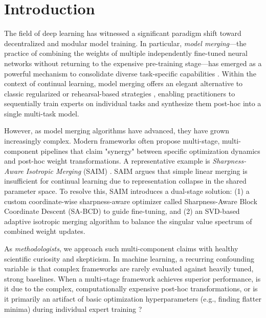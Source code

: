 \section{Introduction}
\label{sec:intro}

The field of deep learning has witnessed a significant paradigm shift toward decentralized and modular model training. In particular, \emph{model merging}—the practice of combining the weights of multiple independently fine-tuned neural networks without returning to the expensive pre-training stage—has emerged as a powerful mechanism to consolidate diverse task-specific capabilities \cite{modelsoups, taskarithmetic, tiesmerging}. Within the context of continual learning, model merging offers an elegant alternative to classic regularized or rehearsal-based strategies \cite{ewc, gem, der, lwf}, enabling practitioners to sequentially train experts on individual tasks and synthesize them post-hoc into a single multi-task model.

However, as model merging algorithms have advanced, they have grown increasingly complex. Modern frameworks often propose multi-stage, multi-component pipelines that claim "synergy" between specific optimization dynamics and post-hoc weight transformations. A representative example is \emph{Sharpness-Aware Isotropic Merging} (SAIM) \cite{saim2026}. SAIM argues that simple linear merging is insufficient for continual learning due to representation collapse in the shared parameter space. To resolve this, SAIM introduces a dual-stage solution: (1) a custom coordinate-wise sharpness-aware optimizer called Sharpness-Aware Block Coordinate Descent (SA-BCD) to guide fine-tuning, and (2) an SVD-based adaptive isotropic merging algorithm to balance the singular value spectrum of combined weight updates.

As \emph{methodologists}, we approach such multi-component claims with healthy scientific curiosity and skepticism. In machine learning, a recurring confounding variable is that complex frameworks are rarely evaluated against heavily tuned, strong baselines. When a multi-stage framework achieves superior performance, is it due to the complex, computationally expensive post-hoc transformations, or is it primarily an artifact of basic optimization hyperparameters (e.g., finding flatter minima) during individual expert training \cite{weight_averaging}? 


